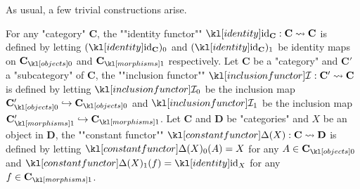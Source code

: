 \documentclass[main.tex]{subfiles}
\begin{document}
\begin{exmps}
	As usual, a few trivial constructions arise.
	\begin{enumerate}
		\itemAP For any "category" $\mathbf{C}$, the ""identity functor"" $\id_{\mathbf{C}}: \mathbf{C}\rightsquigarrow \mathbf{C}$ is defined by letting $(\id_{\mathbf{C}})_0$ and $(\id_{\mathbf{C}})_1$ be identity maps on $\obj{\mathbf{C}}$ and $\mor{\mathbf{C}}$ respectively.
		\itemAP Let $\mathbf{C}$ be a "category" and $\mathbf{C}'$ a "subcategory" of $\mathbf{C}$, the ""inclusion functor"" $\inclF: \mathbf{C}' \rightsquigarrow \mathbf{C}$ is defined by letting $\inclF_0$ be the inclusion map $\obj{\mathbf{C}'} \hookrightarrow \obj{\mathbf{C}}$ and $\inclF_1$ be the inclusion map $\mor{\mathbf{C}'} \hookrightarrow \mor{\mathbf{C}}$.
		\itemAP Let $\mathbf{C}$ and $\mathbf{D}$ be "categories" and $X$ be an object in $\mathbf{D}$, the ""constant functor"" $\constFunc{X}: \mathbf{C} \rightsquigarrow \mathbf{D}$ is defined by letting $\constFunc{X}_0(A) = X$ for any $A \in \obj{\mathbf{C}}$ and $\constFunc{X}_1(f) = \id_X$ for any $f \in \mor{\mathbf{C}}$.
	\end{enumerate}
\end{exmps}
\end{document}
